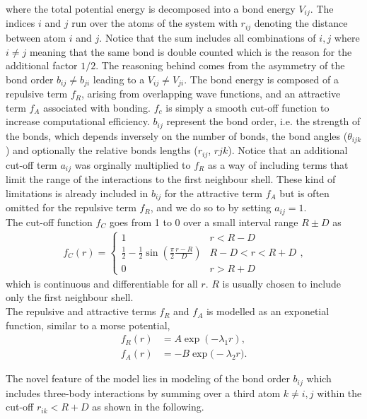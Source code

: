where the total potential energy is decomposed into a bond energy $V_{ij}$. The
indices $i$ and $j$ run over the atoms of the system with $r_{ij}$ denoting the
distance between atom $i$ and $j$. Notice that the sum includes all combinations
of $i,j$ where $i\ne j$ meaning that the same bond is double counted which is
the reason for the additional factor $1/2$. The reasoning behind comes from the
asymmetry of the bond order $b_{ij}\ne b_{ji}$ leading to a $V_{ij}\ne V_{ji}$.
The bond energy is composed of a repulsive term $f_R$, arising from overlapping
wave functions, and an attractive term $f_A$ associated with bonding. $f_c$ is
simply a smooth cut-off function to increase computational efficiency. $b_{ij}$
represent the bond order, i.e. the strength of the bonds, which depends
inversely on the number of bonds, the bond angles ($\theta_{ijk}$) and
optionally the relative bonds lengths ($r_{ij}$, $r{jk}$). Notice that an
additional cut-off term $a_{ij}$ was orginally multiplied to $f_R$ as a way of
including terms that limit the range of the interactions to the first neighbour
shell. These kind of limitations is already included in $b_{ij}$ for the
attractive term $f_A$ but is often omitted for the repulsive term $f_R$, and we
do so to by setting $a_{ij} = 1$. \\
The cut-off function $f_C$ goes from 1 to 0 over a small interval range $R \pm
D$ as
\begin{align*}
  f_C(r) =
  \begin{cases}
    1 & r < R - D \\
    \frac{1}{2} - \frac{1}{2} \sin{(\frac{\pi}{2} \frac{r - R}{D})} & R - D < r < R + D\\
    0 & r > R + D
  \end{cases},
\end{align*}
which is continuous and differentiable for all $r$. $R$ is usually chosen to
include only the first neighbour shell. \\
The repulsive and attractive terms $f_R$ and $f_A$ is modelled as an exponetial
function, similar to a morse potential, 
\begin{align*}
 f_R(r) &= A \exp(-\lambda_1 r), \\
 f_A(r) &= -B \exp \big(-\lambda_2 r\big).
\end{align*}

The novel feature of the model lies in modeling of the bond order $b_{ij}$ which
includes three-body interactions by summing over a third atom $k \ne i,j$ within
the cut-off $r_{ik} < R + D$ as shown in the following.

